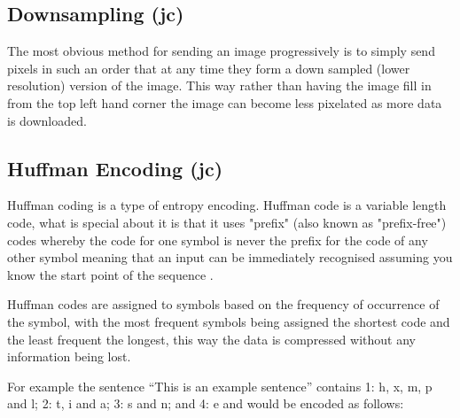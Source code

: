 \subsection{Downsampling (jc)}
\label{downsampling}

The most obvious method for sending an image progressively is to simply send pixels in such an order that at any time they form a down sampled (lower resolution) version of the image. This way rather than having the image fill in from the top left hand corner the image can become less pixelated as more data is downloaded.



\subsection{Huffman Encoding (jc)} 
\label{sec:general_huff}

Huffman coding is a type of entropy encoding. Huffman code is a variable length code, what is special about it is that it uses "prefix" (also known as "prefix-free") codes whereby the code for one symbol is never the prefix for the code of any other symbol meaning that an input can be immediately recognised assuming you know the start point of the sequence \cite{Huffman}.

Huffman codes are assigned to symbols based on the frequency of occurrence of the symbol, with the most frequent symbols being assigned the shortest code and the least frequent the longest, this way the data is compressed without any information being lost. \cite{Huffman}

For example the sentence ``This is an example sentence'' contains 1: h, x, m, p and l; 2: t, i and a; 3: s and n; and 4: e and would be encoded as follows:


